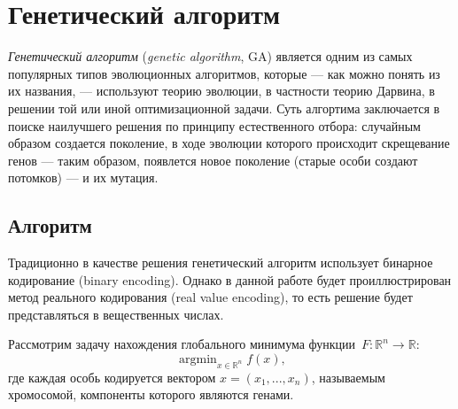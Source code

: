 \chapter{Генетический алгоритм} \label{ParticleSwarmOptimisation}
\noindent
\emph{Генетический алгоритм} (\emph{genetic algorithm}, GA) является одним из самых популярных типов эволюционных алгоритмов, которые --- как можно понять из их названия, --- используют теорию эволюции, в частности теорию Дарвина, в решении той или иной оптимизационной задачи. Суть алгортима заключается в поиске наилучшего решения по принципу естественного отбора: случайным образом создается поколение, в ходе эволюции которого происходит скрещевание генов --- таким образом, появлется новое поколение (старые особи создают потомков) --- и их мутация.

\section{Алгоритм}
\noindent
Традиционно в качестве решения генетический алгоритм использует бинарное кодирование (binary encoding). Однако в данной работе будет проиллюстрирован метод реального кодирования (real value encoding), то есть решение будет представляться в вещественных числах.

Рассмотрим задачу нахождения глобального минимума функции~$F \colon \mathbb{R}^n \to \mathbb{R}$:
\[
	\mathop{\mathrm{argmin}}_{x \in \mathbb{R}^n}f(x),
\]
где каждая особь кодируется вектором $x = (x_1, ..., x_n)$, называемым хромосомой, компоненты которого являются генами.

